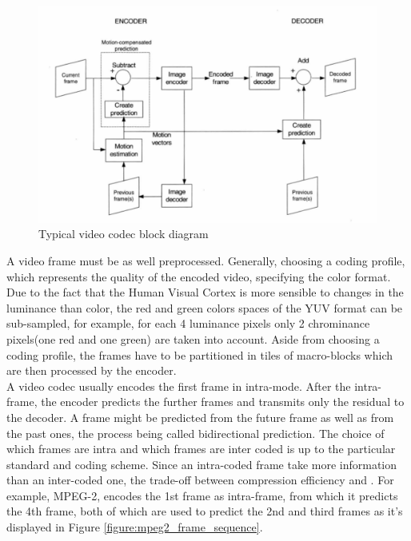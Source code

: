 \documentclass[a4paper,11pt,oneside]{article}
\begin{document}
\begin{figure}[h]
  \centering
  \includegraphics[width=\textwidth]{../figures/f1_codec_block_diagram.pdf}
  \caption{Typical video codec block diagram\cite[pp.~44]{richardson2002video}}
  \label{figure:codec_block_diagram}
\end{figure} 
\clearpage
\indent A video frame must be as well preprocessed. Generally, choosing a coding profile, which represents the quality of the encoded video, specifying the color format. Due to the fact that the Human Visual Cortex is more sensible to changes in the luminance than color, the red and green colors spaces of the YUV format can be sub-sampled, for example, for each 4 luminance pixels only 2 chrominance pixels(one red and one green) are taken into account. Aside from choosing  a coding profile, the frames have to be partitioned in tiles of macro-blocks which are then processed by the encoder. \\
\indent A video codec usually encodes the first frame in intra-mode. After the intra-frame, the encoder predicts the further frames and transmits only the residual to the decoder. A frame might be predicted from the future frame as well as from the past ones, the process being called bidirectional prediction. The choice of which frames are intra and which frames are inter coded is up to the particular standard and coding scheme. Since an intra-coded frame take more information than an inter-coded one, the trade-off between compression efficiency and . For example, MPEG-2, encodes the 1st frame as intra-frame, from which it predicts the 4th frame, both of which are used to predict the 2nd and third frames as it's displayed in Figure \ref{figure:mpeg2_frame_sequence}. \\ 
\end{document}

